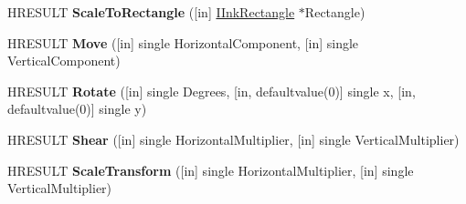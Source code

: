 \begin{DoxyCompactItemize}
H\+R\+E\+S\+U\+LT {\bfseries Scale\+To\+Rectangle} (\mbox{[}in\mbox{]} \hyperlink{interface_m_s_i_n_k_a_u_t_lib_1_1_i_ink_rectangle}{I\+Ink\+Rectangle} $\ast$Rectangle)
\item 
\mbox{\label{interface_m_s_i_n_k_a_u_t_lib_1_1_i_ink_stroke_disp_a5fe5a2d28c05c66a2da51c5521f7229d}} 
H\+R\+E\+S\+U\+LT {\bfseries Move} (\mbox{[}in\mbox{]} single Horizontal\+Component, \mbox{[}in\mbox{]} single Vertical\+Component)
\item 
\mbox{\label{interface_m_s_i_n_k_a_u_t_lib_1_1_i_ink_stroke_disp_aea4631323f9fbfce6b99a76e2f6e7be0}} 
H\+R\+E\+S\+U\+LT {\bfseries Rotate} (\mbox{[}in\mbox{]} single Degrees, \mbox{[}in, defaultvalue(0)\mbox{]} single x, \mbox{[}in, defaultvalue(0)\mbox{]} single y)
\item 
\mbox{\label{interface_m_s_i_n_k_a_u_t_lib_1_1_i_ink_stroke_disp_a3fca1cf3088852f34cfad3b6dfad2416}} 
H\+R\+E\+S\+U\+LT {\bfseries Shear} (\mbox{[}in\mbox{]} single Horizontal\+Multiplier, \mbox{[}in\mbox{]} single Vertical\+Multiplier)
\item 
\mbox{\label{interface_m_s_i_n_k_a_u_t_lib_1_1_i_ink_stroke_disp_acacd7fcba9cbfc850c13fb8b387594e5}} 
H\+R\+E\+S\+U\+LT {\bfseries Scale\+Transform} (\mbox{[}in\mbox{]} single Horizontal\+Multiplier, \mbox{[}in\mbox{]} single Vertical\+Multiplier)
\end{DoxyCompactItemize}
